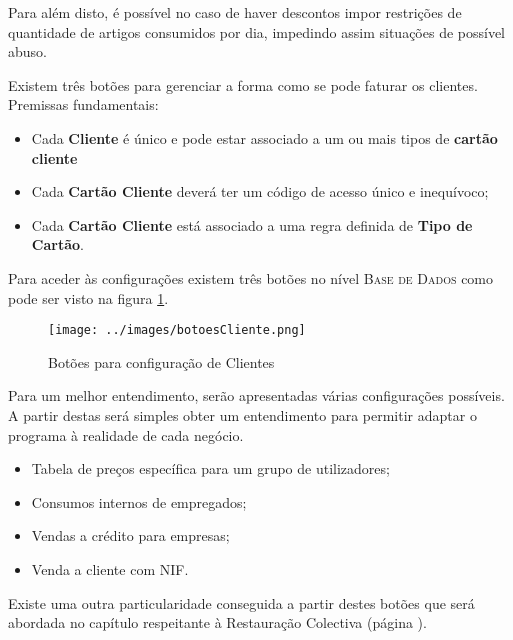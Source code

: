 \documentclass[a4paper,11pt,openany]{memoir}
\begin{document}
Para além disto, é possível no caso de haver descontos impor restrições de quantidade de artigos consumidos
por dia, impedindo assim situações de possível abuso.



Existem três botões para gerenciar a forma como se pode faturar os clientes.
Premissas fundamentais:
\begin{itemize}
\item Cada \textbf{Cliente} é único e pode estar associado a um ou mais tipos de \textbf{cartão cliente}
\item Cada \textbf{Cartão Cliente} deverá ter um código de acesso único e inequívoco;
\item Cada \textbf{Cartão Cliente} está associado a uma regra definida de \textbf{Tipo de Cartão}.
\end{itemize}



Para aceder às configurações existem três botões no nível \textsc{Base de Dados} como pode ser visto na figura \ref{botoesCliente}.



\begin{figure}[h]
\begin{center}
\texttt{[image: ../images/botoesCliente.png]}
\caption[Submanifold]{Botões para configuração de Clientes}
\label{botoesCliente}
\end{center}
\end{figure}

Para um melhor entendimento, serão apresentadas várias configurações possíveis. 
A partir destas será simples obter um entendimento para permitir adaptar o programa à realidade de cada negócio.

\begin{itemize}
\item Tabela de preços específica para um grupo de utilizadores;
\item Consumos internos de empregados;
\item Vendas a crédito para empresas;
\item Venda a cliente com NIF.
\end{itemize}

Existe uma outra particularidade conseguida a partir destes botões que será abordada 
no capítulo respeitante à Restauração Colectiva (página \pageref{ch:restauracaocolectiva}).
\end{document}
